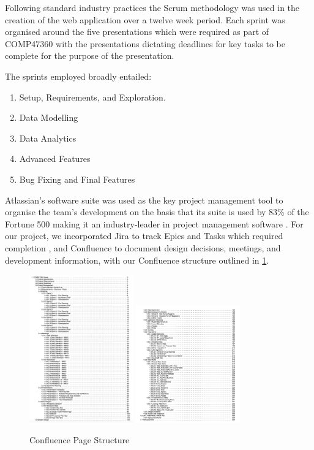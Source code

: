 \documentclass[]{UCD_CS_47360_Report}
\begin{document}
Following standard industry practices the Scrum methodology \cite{Scrum-Guide} was used in the creation of the web application over a twelve week period. Each sprint was organised around the five presentations which were required as part of COMP47360 with the presentations dictating deadlines for key tasks to be complete for the purpose of the presentation.

The sprints employed broadly entailed:
\begin{enumerate}
    \item Setup, Requirements, and Exploration.
    \item Data Modelling
    \item Data Analytics
    \item Advanced Features
    \item Bug Fixing and Final Features
\end{enumerate}

Atlassian's software suite was used as the key project management tool to organise the team's development on the basis that its suite is used by 83\% of the Fortune 500 making it an industry-leader in project management software \cite{AtlassianUsage}. For our project, we incorporated Jira to track Epics and Tasks which required completion \cite{Epics}, and Confluence to document design decisions, meetings, and development information, with our Confluence structure outlined in \ref{fig:ConfluenceOverview}. 

\begin{figure}[!htb]
    \centering
    \includegraphics[width=0.4\textwidth]{figures/3_1_Confluence_1.png}
    \includegraphics[width=0.4\textwidth]{figures/3_1_Confluence_2.png}
    \caption{Confluence Page Structure}
    \label{fig:ConfluenceOverview}
\end{figure}
\end{document}
